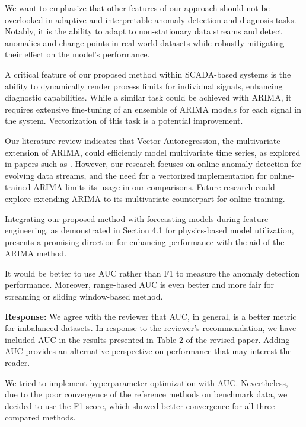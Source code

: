\documentclass{article}
\makeatletter
\newenvironment{comment}{
\begin{sloppypar}\slshape
\vspace{5 mm}
\color{blue}
 \@beginparpenalty\@M
  \begin{list}{}{\setlength{\topsep}{0ex}%
  \setlength{\leftmargin}{\rightmargin}}\item[]
 \@beginparpenalty\@endparpenalty
}
{\end{list}
\end{sloppypar}
}
\makeatother
\begin{document}
\begin{enumerate}
        We want to emphasize that other features of our approach should not be overlooked in adaptive and interpretable anomaly detection and diagnosis tasks. Notably, it is the ability to adapt to non-stationary data streams and detect anomalies and change points in real-world datasets while robustly mitigating their effect on the model's performance.

        A critical feature of our proposed method within SCADA-based systems is the ability to dynamically render process limits for individual signals, enhancing diagnostic capabilities. While a similar task could be achieved with ARIMA, it requires extensive fine-tuning of an ensemble of ARIMA models for each signal in the system. Vectorization of this task is a potential improvement.

        Our literature review indicates that Vector Autoregression, the multivariate extension of ARIMA, could efficiently model multivariate time series, as explored in papers such as \cite{Melnyk2016, Zhang2023}. However, our research focuses on online anomaly detection for evolving data streams, and the need for a vectorized implementation for online-trained ARIMA limits its usage in our comparisons. Future research could explore extending ARIMA to its multivariate counterpart for online training.
      
        Integrating our proposed method with forecasting models during feature engineering, as demonstrated in Section 4.1 for physics-based model utilization, presents a promising direction for enhancing performance with the aid of the ARIMA method.

  \item
        \begin{comment}
        It would be better to use AUC rather than F1 to measure the anomaly detection performance. Moreover, range-based AUC is even better and more fair for streaming or sliding window-based method.
        \end{comment}
        {\bf Response:}
        We agree with the reviewer that AUC, in general, is a better metric for imbalanced datasets. In response to the reviewer's recommendation, we have included AUC in the results presented in Table 2 of the revised paper. Adding AUC provides an alternative perspective on performance that may interest the reader.
        
        We tried to implement hyperparameter optimization with AUC. Nevertheless, due to the poor convergence of the reference methods on benchmark data, we decided to use the F1 score, which showed better convergence for all three compared methods.


\end{enumerate}
\end{document}
